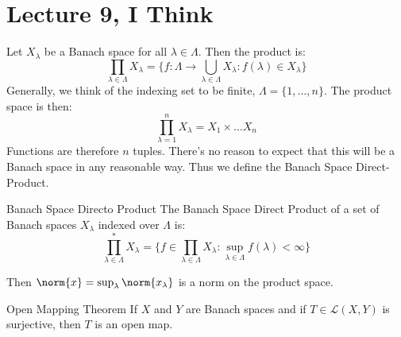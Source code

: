 \documentclass[crop=false,class=book,oneside]{standalone}
\begin{document}
    \section{Lecture 9, I Think}
        Let $X_{\lambda}$ be a Banach space for all
        $\lambda\in\Lambda$. Then the product is:
        \begin{equation}
            \prod_{\lambda\in\Lambda}X_{\lambda}
            =\{f:\Lambda\rightarrow\bigcup_{\lambda\in\Lambda}
            X_{\lambda}:f(\lambda)\in{X}_{\lambda}\}
        \end{equation}
        Generally, we think of the indexing set to be finite,
        $\Lambda=\{1,\dots,n\}$. The product space is then:
        \begin{equation}
            \prod_{\lambda=1}^{n}X_{\lambda}=
            X_{1}\times\dots{X}_{n}
        \end{equation}
        Functions are therefore $n$ tuples. There's no reason to
        expect that this will be a Banach space in any reasonable
        way. Thus we define the Banach Space Direct-Product.
        \begin{ldefinition}{Banach Space Directo Product}
            The Banach Space Direct Product of a set of Banach
            spaces $X_{\lambda}$ indexed over $\Lambda$ is:
            \begin{equation}
                \prod_{\lambda\in\Lambda}^{*}X_{\lambda}
                =\{f\in\prod_{\lambda\in\Lambda}X_{\lambda}:
                \underset{\lambda\in\Lambda}{\sup}
                f(\lambda)<\infty\}
            \end{equation}
        \end{ldefinition}
        Then $\norm{x}=\sup_{\lambda}\norm{x_{\lambda}}$ is a norm
        on the product space.
        \begin{ltheorem}{Open Mapping Theorem}
            If $X$ and $Y$ are Banach spaces and if
            $T\in\mathcal{L}(X,Y)$ is surjective, then $T$ is an
            open map.
        \end{ltheorem}
\end{document}

